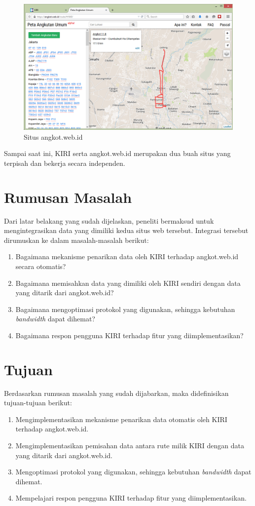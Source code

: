 \begin{figure}
	\centering
	\includegraphics[scale=0.5]{Gambar/1_angkotwebid}
	\caption{Situs angkot.web.id}
	\label{fig:1_angkotwebid}
\end{figure}

Sampai saat ini, KIRI serta angkot.web.id merupakan dua buah situs yang terpisah dan bekerja secara independen.

\section{Rumusan Masalah}
\label{sec:rumusan_masalah}
Dari latar belakang yang sudah dijelaskan, peneliti bermaksud untuk mengintegrasikan data yang dimiliki kedua situs web tersebut. Integrasi tersebut dirumuskan ke dalam masalah-masalah berikut:
\begin{enumerate}
	\item Bagaimana mekanisme penarikan data oleh KIRI terhadap angkot.web.id secara otomatis?
	\item Bagaimana memisahkan data yang dimiliki oleh KIRI sendiri dengan data yang ditarik dari angkot.web.id?
	\item Bagaimana mengoptimasi protokol yang digunakan, sehingga kebutuhan \textit{bandwidth} dapat dihemat?
	\item Bagaimana respon pengguna KIRI terhadap fitur yang diimplementasikan?
\end{enumerate}

\section{Tujuan}
\label{sec:tujuan}
Berdasarkan rumusan masalah yang sudah dijabarkan, maka didefinisikan tujuan-tujuan berikut:
\begin{enumerate}
	\item Mengimplementasikan mekanisme penarikan data otomatis oleh KIRI terhadap angkot.web.id.
	\item Mengimplementasikan pemisahan data antara rute milik KIRI dengan data yang ditarik dari angkot.web.id.
	\item Mengoptimasi protokol yang digunakan, sehingga kebutuhan \textit{bandwidth} dapat dihemat.
	\item Mempelajari respon pengguna KIRI terhadap fitur yang diimplementasikan.
\end{enumerate}

